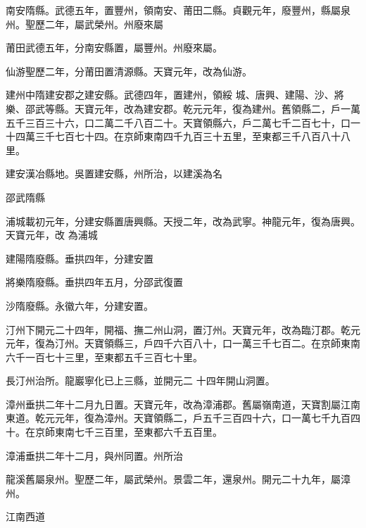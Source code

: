 \begin{pinyinscope}
 南安隋縣。武德五年，置豐州，領南安、莆田二縣。貞觀元年，廢豐州，縣屬泉州。聖歷二年，屬武榮州。州廢來屬



 莆田武德五年，分南安縣置，屬豐州。州廢來屬。



 仙游聖歷二年，分莆田置清源縣。天寶元年，改為仙游。



 建州中隋建安郡之建安縣。武德四年，置建州，領綏
 城、唐興、建陽、沙、將樂、邵武等縣。天寶元年，改為建安郡。乾元元年，復為建州。舊領縣二，戶一萬五千三百三十六，口二萬二千八百二十。天寶領縣六，戶二萬七千二百七十，口一十四萬三千七百七十四。在京師東南四千九百三十五里，至東都三千八百八十八里。



 建安漢冶縣地。吳置建安縣，州所治，以建溪為名



 邵武隋縣



 浦城載初元年，分建安縣置唐興縣。天授二年，改為武寧。神龍元年，復為唐興。天寶元年，改
 為浦城



 建陽隋廢縣。垂拱四年，分建安置



 將樂隋廢縣。垂拱四年五月，分邵武復置



 沙隋廢縣。永徽六年，分建安置。



 汀州下開元二十四年，開福、撫二州山洞，置汀州。天寶元年，改為臨汀郡。乾元元年，復為汀州。天寶領縣三，戶四千六百八十，口一萬三千七百二。在京師東南六千一百七十三里，至東都五千三百七十里。



 長汀州治所。龍巖寧化已上三縣，並開元二
 十四年開山洞置。



 漳州垂拱二年十二月九日置。天寶元年，改為漳浦郡。舊屬嶺南道，天寶割屬江南東道。乾元元年，復為漳州。天寶領縣二，戶五千三百四十六，口一萬七千九百四十。在京師東南七千三百里，至東都六千五百里。



 漳浦垂拱二年十二月，與州同置。州所治



 龍溪舊屬泉州。聖歷二年，屬武榮州。景雲二年，還泉州。開元二十九年，屬漳州。



 江南西道




\end{pinyinscope}
